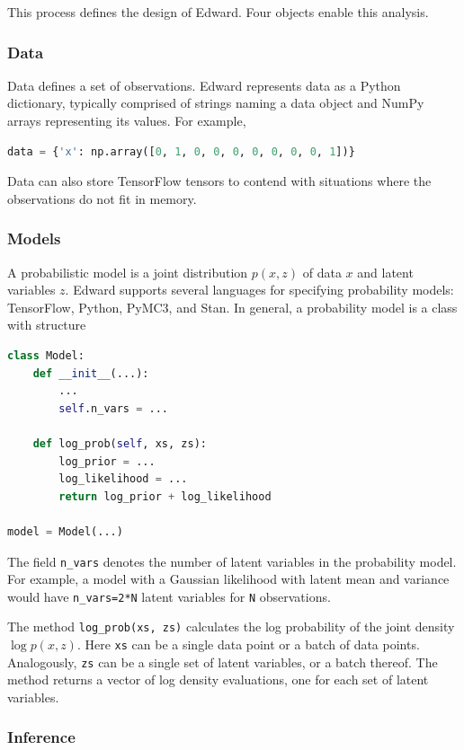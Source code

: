 This process defines the design of Edward. Four objects enable this
analysis.

\subsubsection{Data}

Data defines a set of observations. Edward represents
data as a Python dictionary, typically comprised of strings naming a
data object and NumPy arrays representing its values. For example,

\begin{lstlisting}[language=Python]
data = {'x': np.array([0, 1, 0, 0, 0, 0, 0, 0, 0, 1])}
\end{lstlisting}

Data can also store TensorFlow tensors to contend with situations where the
observations do not fit in memory.

\subsubsection{Models}\label{models}

A probabilistic model is a joint distribution $p(x, z)$ of data $x$ and latent
variables $z$.
Edward supports several languages for specifying probability models:
TensorFlow, Python, PyMC3, and Stan. In general, a probability
model is a class with structure
\begin{lstlisting}[language=Python]
class Model:
    def __init__(...):
        ...
        self.n_vars = ...

    def log_prob(self, xs, zs):
        log_prior = ...
        log_likelihood = ...
        return log_prior + log_likelihood

model = Model(...)
\end{lstlisting}
The field \texttt{n\_vars} denotes the number of latent variables in the
probability model. For example, a model with a Gaussian likelihood with latent
mean and variance would have \texttt{n\_vars=2*N} latent variables for
\texttt{N} observations.

The method \texttt{log_prob(xs, zs)} calculates the log probability of
the joint density $\log p(x,z)$. Here \texttt{xs} can be a single data
point or a batch of data points. Analogously, \texttt{zs} can be a
single set of latent variables, or a batch thereof. The method returns a vector
of log density evaluations, one for each set of latent variables.

\subsubsection{Inference}\label{inference}

